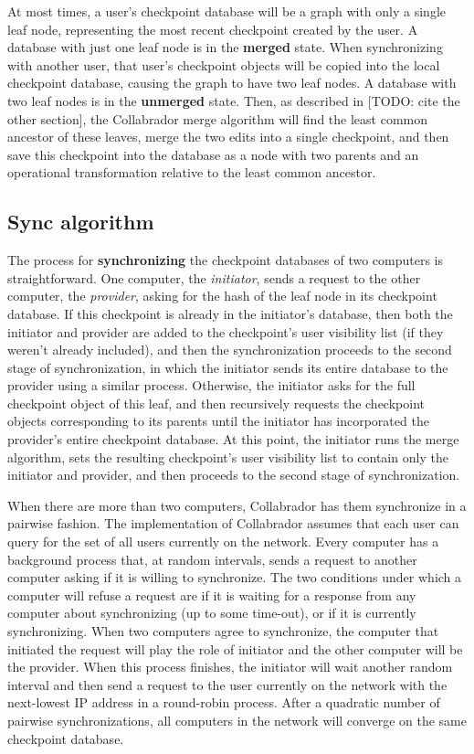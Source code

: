 \documentclass[11pt,titlepage]{article}
\begin{document}
At most times, a user's checkpoint database will be a graph with only a single leaf node, representing the most recent checkpoint created by the user. A database with just one leaf node is in the \textbf{merged} state. When synchronizing with another user, that user's checkpoint objects will be copied into the local checkpoint database, causing the graph to have two leaf nodes. A database with two leaf nodes is in the \textbf{unmerged} state. Then, as described in [TODO: cite the other section], the Collabrador merge algorithm will find the least common ancestor of these leaves, merge the two edits into a single checkpoint, and then save this checkpoint into the database as a node with two parents and an operational transformation relative to the least common ancestor.

\subsection{Sync algorithm}

The process for \textbf{synchronizing} the checkpoint databases of two computers is straightforward. One computer, the \emph{initiator}, sends a request to the other computer, the \emph{provider}, asking for the hash of the leaf node in its checkpoint database. If this checkpoint is already in the initiator's database, then both the initiator and provider are added to the checkpoint's user visibility list (if they weren't already included), and then the synchronization proceeds to the second stage of synchronization, in which the initiator sends its entire database to the provider using a similar process. Otherwise, the initiator asks for the full checkpoint object of this leaf, and then recursively requests the checkpoint objects corresponding to its parents until the initiator has incorporated the provider's entire checkpoint database. At this point, the initiator runs the merge algorithm, sets the resulting checkpoint's user visibility list to contain only the initiator and provider, and then proceeds to the second stage of synchronization.

When there are more than two computers, Collabrador has them synchronize in a pairwise fashion. The implementation of Collabrador assumes that each user can query for the set of all users currently on the network. Every computer has a background process that, at random intervals, sends a request to another computer asking if it is willing to synchronize. The two conditions under which a computer will refuse a request are if it is waiting for a response from any computer about synchronizing (up to some time-out), or if it is currently synchronizing. When two computers agree to synchronize, the computer that initiated the request will play the role of initiator and the other computer will be the provider. When this process finishes, the initiator will wait another random interval and then send a request to the user currently on the network with the next-lowest IP address in a round-robin process. After a quadratic number of pairwise synchronizations, all computers in the network will converge on the same checkpoint database.
\end{document}
